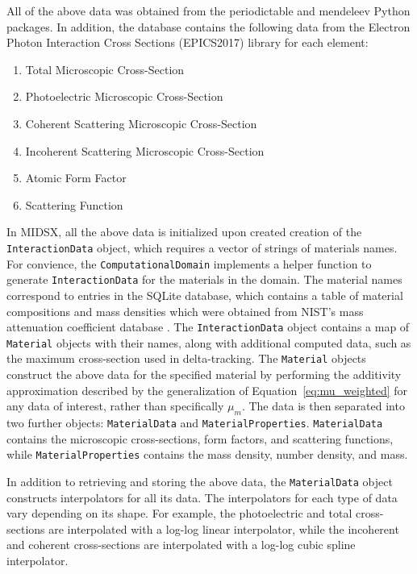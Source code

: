 \par All of the above data was obtained from the periodictable \cite{periodictable2022} and mendeleev \cite{mendeleev2021} Python packages. In addition, the database contains the following data from the Electron Photon Interaction Cross Sections (EPICS2017) library \cite{cullen_survey_nodate} for each element:

\begin{enumerate}
    \item Total Microscopic Cross-Section
    \item Photoelectric Microscopic Cross-Section
    \item Coherent Scattering Microscopic Cross-Section
    \item Incoherent Scattering Microscopic Cross-Section
    \item Atomic Form Factor
    \item Scattering Function
\end{enumerate}

\par In MIDSX, all the above data is initialized upon created creation of the \texttt{InteractionData} object, which requires a vector of strings of materials names. For convience, the \texttt{ComputationalDomain} implements a helper function to generate \texttt{InteractionData} for the materials in the domain. The material names correspond to entries in the SQLite database, which contains a table of material compositions and mass densities which were obtained from NIST's mass attenuation coefficient database \cite{hubbell_x-ray_2004}. The \texttt{InteractionData} object contains a map of \texttt{Material} objects with their names, along with additional computed data, such as the maximum cross-section used in delta-tracking. The \texttt{Material} objects construct the above data for the specified material by performing the additivity approximation described by the generalization of Equation~\ref{eq:mu_weighted} for any data of interest, rather than specifically $\mu_m$. The data is then separated into two further objects: \texttt{MaterialData} and \texttt{MaterialProperties}. \texttt{MaterialData} contains the microscopic cross-sections, form factors, and scattering functions, while \texttt{MaterialProperties} contains the mass density, number density, and mass.
\par In addition to retrieving and storing the above data, the \texttt{MaterialData} object constructs interpolators for all its data. The interpolators for each type of data vary depending on its shape. For example, the photoelectric and total cross-sections are interpolated with a log-log linear interpolator, while the incoherent and coherent cross-sections are interpolated with a log-log cubic spline interpolator.


